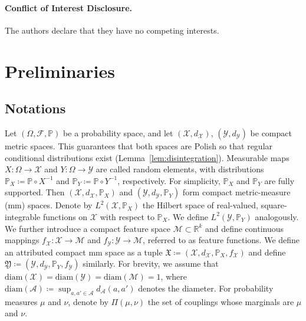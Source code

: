 \documentclass{article}
\theoremstyle{plain}
\theoremstyle{definition}
\theoremstyle{remark}
\begin{document}
\paragraph{Conflict of Interest Disclosure.}
The authors declare that they have no competing interests.

\vspace{-2mm}
\section{Preliminaries}\label{sec:preliminaries}
\subsection{Notations}
Let $(\Omega,\mathcal{F},\mathbb{P})$ be a probability space, and let $(\mathcal{X},d_{\mathcal{X}})$, $(\mathcal{Y},d_{\mathcal{Y}})$ be compact metric spaces. This guarantees that both spaces are Polish so that regular conditional distributions exist (Lemma~\ref{lem:disintegration}).
Measurable maps $X:\Omega\to \mathcal{X}$ and $Y:\Omega\to \mathcal{Y}$ are called random elements, with distributions $\mathbb{P}_X\coloneqq\mathbb{P}\circ X^{-1}$ and $\mathbb{P}_Y\coloneqq\mathbb{P}\circ Y^{-1}$, respectively. For simplicity, $\mathbb{P}_X$ and $\mathbb{P}_Y$ are fully supported. Then $(\mathcal{X},d_{\mathcal{X}},\mathbb{P}_X)$ and $(\mathcal{Y},d_{\mathcal{Y}},\mathbb{P}_Y)$ form compact metric-measure (mm) spaces.
Denote by $L^2(\mathcal{X},\mathbb{P}_X)$ the Hilbert space of real-valued, square-integrable functions on $\mathcal{X}$ with respect to $\mathbb{P}_X$. We define $L^2(\mathcal{Y},\mathbb{P}_Y)$ analogously.
We further introduce a compact feature space $\mathcal{M}\subset\mathbb{R}^k$ and define continuous mappings $f_{\mathcal{X}}:\mathcal{X}\to \mathcal{M}$ and $f_{\mathcal{Y}}:\mathcal{Y}\to \mathcal{M}$, referred to as feature functions. 
We define an attributed compact mm space as a tuple $\mathfrak{X} \coloneqq (\mathcal{X}, d_{\mathcal{X}}, \mathbb{P}_X, f_{\mathcal{X}})$ and define $\mathfrak{Y} \coloneqq (\mathcal{Y}, d_{\mathcal{Y}}, \mathbb{P}_Y, f_{\mathcal{Y}})$ similarly.
For brevity, we assume that $\mathrm{diam}(\mathcal{X}) = \mathrm{diam}(\mathcal{Y}) = \mathrm{diam}(\mathcal{M}) = 1$, where $\mathrm{diam}(\mathcal{A}) \coloneqq \sup_{a,a'\in \mathcal{A}} d_{\mathcal{A}}(a,a')$ denotes the diameter. For probability measures $\mu$ and $\nu$, denote by $\Pi(\mu,\nu)$ the set of couplings whose marginals are $\mu$ and $\nu$.
\end{document}
